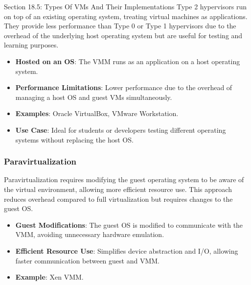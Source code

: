 \begin{notes}{Section 18.5: Types Of VMs And Their Implementations}
    Type 2 hypervisors run on top of an existing operating system, treating virtual machines as applications. They provide less performance than Type 0 or Type 1 hypervisors due to the overhead of 
    the underlying host operating system but are useful for testing and learning purposes.
    
    \begin{highlight}
    
        \begin{itemize}
            \item \textbf{Hosted on an OS}: The VMM runs as an application on a host operating system.
            \item \textbf{Performance Limitations}: Lower performance due to the overhead of managing a host OS and guest VMs simultaneously.
            \item \textbf{Examples}: Oracle VirtualBox, VMware Workstation.
            \item \textbf{Use Case}: Ideal for students or developers testing different operating systems without replacing the host OS.
        \end{itemize}
    
    \end{highlight}
    
    \subsubsection*{Paravirtualization}
    
    Paravirtualization requires modifying the guest operating system to be aware of the virtual environment, allowing more efficient resource use. This approach reduces overhead compared to full virtualization 
    but requires changes to the guest OS.
    
    \begin{highlight}[Paravirtualization]
    
        \begin{itemize}
            \item \textbf{Guest Modifications}: The guest OS is modified to communicate with the VMM, avoiding unnecessary hardware emulation.
            \item \textbf{Efficient Resource Use}: Simplifies device abstraction and I/O, allowing faster communication between guest and VMM.
            \item \textbf{Example}: Xen VMM.
        \end{itemize}
    

\end{highlight}
\end{notes}
